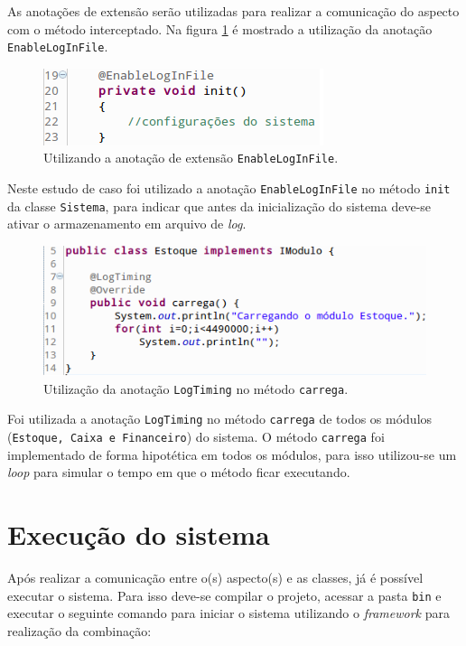 \documentclass[tc,oneside]{iiufrgs}
\begin{document}
As anotações de extensão serão utilizadas para realizar a comunicação do aspecto com o método interceptado. Na figura \ref{fig:usingenablelog} é mostrado a utilização da anotação \texttt{EnableLogInFile}.

\begin{figure}[ht]
	\centering
	\includegraphics[scale=0.7]{figuras/estudo/initSistema.png}
	\caption{Utilizando a anotação de extensão \texttt{EnableLogInFile}.}
	\label{fig:usingenablelog}
\end{figure}

Neste estudo de caso foi utilizado a anotação \texttt{EnableLogInFile} no método \texttt{init} da classe \texttt{Sistema}, para indicar que antes da inicialização do sistema deve-se ativar o armazenamento em arquivo de \textit{log}.

\begin{figure}[ht]
	\centering
	\includegraphics[scale=0.7]{figuras/estudo/modulo.png}
	\caption{Utilização da anotação \texttt{LogTiming} no método \texttt{carrega}.}
	\label{fig:usinglogtiming}
\end{figure}

Foi utilizada a anotação \texttt{LogTiming} no método \texttt{carrega} de todos os módulos (\texttt{Estoque, Caixa e Financeiro}) do sistema. O método \texttt{carrega} foi implementado de forma hipotética em todos os módulos, para isso utilizou-se um \textit{loop} para simular o tempo em que o método ficar executando.

\section{Execução do sistema}

Após realizar a comunicação entre o(s) aspecto(s) e as classes, já é possível executar o sistema. Para isso deve-se compilar o projeto, acessar a pasta \texttt{bin} e executar o seguinte comando para iniciar o sistema utilizando o \textit{framework} para realização da combinação:
\end{document}
